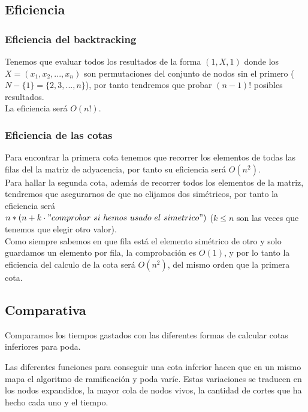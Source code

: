 \subsection{Eficiencia}
\subsubsection{Eficiencia del backtracking}

Tenemos que evaluar todos los resultados de la forma $(1, X, 1)$ donde los $X = (x_1, x_2, ... , x_n)$ son permutaciones del conjunto de nodos sin el primero ($N - \{1\} = \{2, 3, ... , n\}$), por tanto tendremos que probar $(n-1)!$ posibles resultados.\\
La eficiencia será $O(n!)$.

\subsubsection{Eficiencia de las cotas}

Para encontrar la primera cota tenemos que recorrer los elementos de todas las filas del la matriz de adyacencia, por tanto su eficiencia será $O(n^2)$.\\

Para hallar la segunda cota, además de recorrer todos los elementos de la matriz, tendremos que asegurarnos de que no elijamos dos simétricos, por tanto la eficiencia será\\ $n*(n + k \cdot "comprobar\ si\ hemos\ usado\ el\ simetrico")$ ($k \leq n$ son las veces que tenemos que elegir otro valor).\\
Como siempre sabemos en que fila está el elemento simétrico de otro y solo guardamos un elemento por fila, la comprobación es $O(1)$, y por lo tanto la eficiencia del calculo de la cota será $O(n^2)$, del mismo orden que la primera cota.



\subsection{Comparativa}
Comparamos los tiempos gastados con las diferentes formas de calcular cotas inferiores para poda.

Las diferentes funciones para conseguir una cota inferior hacen que en un mismo mapa
el algoritmo de ramificación y poda varíe. 
Estas variaciones se traducen en los nodos expandidos, la mayor cola de nodos vivos, la cantidad de
cortes que ha hecho cada uno y el tiempo.


